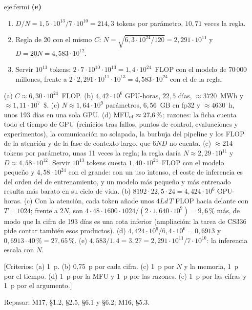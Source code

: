 \begin{solucion}{eje:fermi}
\noindent\textbf{(e)}
\begin{enumerate}[label=\arabic*.]
  \item $D/N=1{,}5\cdot 10^{13}/7\cdot 10^{10}=214{,}3$ tokens por parámetro, $10{,}71$ veces la regla.
  \item Regla de 20 con el mismo $C$: $N=\sqrt{6{,}3\cdot 10^{24}/120}=2{,}291\cdot 10^{11}$ y $D=20N=4{,}583\cdot 10^{12}$.
  \item Servir $10^{13}$ tokens: $2\cdot 7\cdot 10^{10}\cdot 10^{13}=1{,}4\cdot 10^{24}$~FLOP con el modelo de 70\,000 millones, frente a $2\cdot 2{,}291\cdot 10^{11}\cdot 10^{13}=4{,}583\cdot 10^{24}$ con el de la regla.
\end{enumerate}
\resultado (a) $C\approx 6{,}30\cdot 10^{24}$~FLOP. (b) $4{,}42\cdot 10^{6}$ GPU-horas, $22{,}5$ días, $\approx 3720$~MWh y $\approx 1{,}11\cdot 10^{7}$~\$. (c) $N\approx 1{,}64\cdot 10^{9}$ parámetros, $6{,}56$~GB en fp32 y $\approx 4630$~h, unos 193 días en una sola GPU. (d) $\mathrm{MFU}_{\mathrm{ef}}\approx 27{,}6\,\%$; razones: la ficha cuenta todo el tiempo de GPU (reinicios tras fallos, puntos de control, evaluaciones y experimentos), la comunicación no solapada, la burbuja del pipeline y los FLOP de la atención y de la fase de contexto largo, que $6ND$ no cuenta. (e) $\approx 214$ tokens por parámetro, unas 11 veces la regla; la regla daría $N\approx 2{,}29\cdot 10^{11}$ y $D\approx 4{,}58\cdot 10^{12}$. Servir $10^{13}$ tokens cuesta $1{,}40\cdot 10^{24}$~FLOP con el modelo pequeño y $4{,}58\cdot 10^{24}$ con el grande: con un uso intenso, el coste de inferencia es del orden del de entrenamiento, y un modelo más pequeño y más entrenado resulta más barato en su ciclo de vida.
\comprobacion (b) $8192\cdot 22{,}5\cdot 24=4{,}424\cdot 10^{6}$ GPU-horas. (c) Con la atención, cada token añade unos $4Ld\,T$ FLOP hacia delante con $T=1024$; frente a $2N$, son $4\cdot 48\cdot 1600\cdot 1024/(2\cdot 1{,}640\cdot 10^{9})=9{,}6\,\%$ más, de modo que la cifra de 193 días es una cota inferior (ampliación: la tarea de CS336 pide contar también esos productos). (d) $4{,}424\cdot 10^{6}/6{,}4\cdot 10^{6}=0{,}6913$ y $0{,}6913\cdot 40\,\%=27{,}65\,\%$. (e) $4{,}583/1{,}4=3{,}27=2{,}291\cdot 10^{11}/7\cdot 10^{10}$: la inferencia escala con $N$.

[Criterios: (a) 1~p. (b) 0{,}75~p por cada cifra. (c) 1~p por $N$ y la memoria, 1~p por el tiempo. (d) 1~p por la MFU y 1~p por las razones. (e) 1~p por las cifras y 1~p por el argumento.]

Repasar: M17, §1.2, §2.5, §6.1 y §6.2; M16, §5.3.
\end{solucion}

